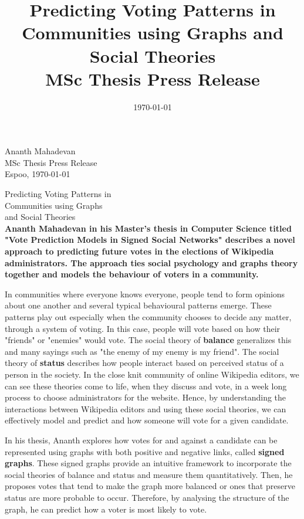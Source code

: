 \documentclass[12pt,a4paper]{article}
\title{\color{astral}\myfont Predicting Voting Patterns in Communities using  Graphs and Social Theories\\
  \Large MSc Thesis Press Release}
\date{\today}
\author{\AUTHOR}
\newcommand{\AUTHOR}{Ananth Mahadevan}
\newcommand{\TTITLE}{Vote Prediction Models in Signed Social Networks}
\begin{document}
{\raggedleft \AUTHOR\\
\vskip 2mm
\noindent
MSc Thesis Press Release\\
\vskip 2mm
\noindent Espoo, \today
\vskip 10mm
}

{\centering \color{astral}\myfont Predicting Voting Patterns in \\Communities using  Graphs \\and Social Theories\\
}
\vskip 4mm
\noindent
{\bf
\large
Ananth Mahadevan in his Master's thesis in Computer Science titled "\TTITLE" describes a novel approach to predicting future votes in the elections of Wikipedia administrators. The approach ties social psychology and graphs theory together and models the behaviour of voters in a community.
}

\medskip
\noindent
In communities where everyone knows everyone, people tend to form opinions about one another and several typical behavioural patterns emerge.
These patterns play out especially when the community chooses to decide any matter, through a system of voting.
In this case, people will vote based on how their "friends" or "enemies" would vote.
The social theory of \textbf{balance} generalizes this and many sayings such as "the enemy of my enemy is my friend".
The social theory of \textbf{status} describes how people interact based on perceived status of a person in the society.
In the close knit community of online Wikipedia editors, we can see these theories come to life, when they discuss and vote, in a week long process to choose administrators for the website.
Hence, by understanding the interactions between Wikipedia editors and using these social theories, we can effectively model and predict and how someone will vote for a given candidate.

\medskip
\noindent
In his thesis, Ananth explores how votes for and against a candidate can be represented using graphs with both positive and negative links, called \textbf{signed graphs}.
These signed graphs provide an intuitive framework to incorporate the social theories of balance and status and measure them quantitatively.
Then, he proposes votes that tend to make the graph more balanced or ones that preserve status are more probable to occur.
Therefore, by analysing the structure of the graph, he can predict how a voter is most likely to vote. 
\end{document}
